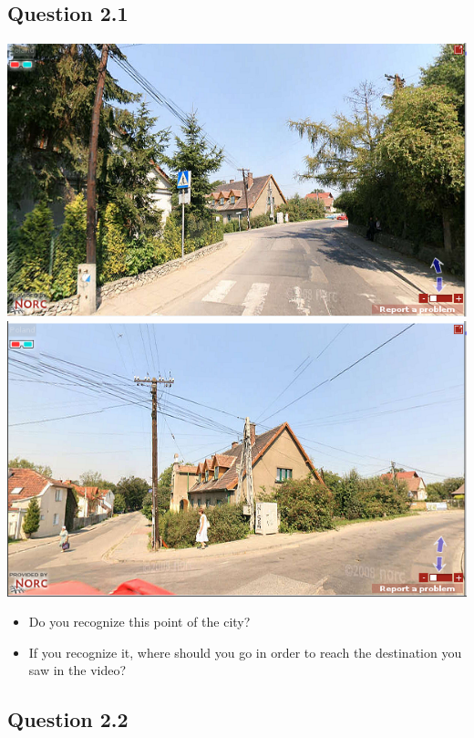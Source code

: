 \documentclass[12pt,a4paper,openright, notitlepage]{report}
\begin{document}
\newpage

\subsection{Question 2.1}

\includegraphics[width=\textwidth]{imgs/image-question21-1}
\includegraphics[width=\textwidth]{imgs/image-question21-2}

\begin{itemize}
	\item Do you recognize this point of the city?
	\item If you recognize it, where should you go in order to reach the destination you saw in the video?
\end{itemize}

\newpage

\subsection{Question 2.2}
\end{document}
